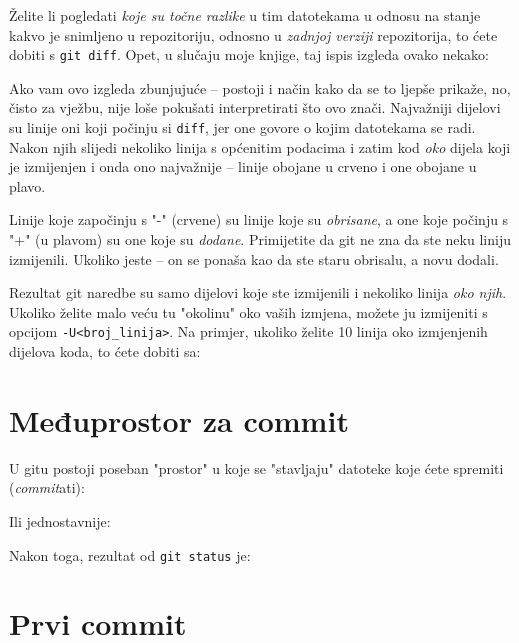 Želite li pogledati \emph{koje su točne razlike} u tim datotekama u odnosu na stanje kakvo je snimljeno u repozitoriju, odnosno u \emph{zadnjoj verziji} repozitorija, to ćete dobiti s \verb+git diff+. 
Opet, u slučaju moje knjige, taj ispis izgleda ovako nekako:



Ako vam ovo izgleda zbunjujuće -- postoji i način kako da se to ljepše prikaže, no, čisto za vježbu, nije loše pokušati interpretirati što ovo znači.
Najvažniji dijelovi su linije oni koji počinju si \verb+diff+, jer one govore o kojim datotekama se radi.
Nakon njih slijedi nekoliko linija s općenitim podacima i zatim kod \emph{oko} dijela koji je izmijenjen i onda ono najvažnije -- linije obojane u crveno i one obojane u plavo.

Linije koje započinju s "-" (crvene) su linije koje su \emph{obrisane}, a one koje počinju s "+" (u plavom) su one koje su \emph{dodane}. 
Primijetite da git ne zna da ste neku liniju izmijenili. 
Ukoliko jeste -- on se ponaša kao da ste staru obrisalu, a novu dodali.

Rezultat git naredbe su samo dijelovi koje ste izmijenili i nekoliko linija \emph{oko njih}.
Ukoliko želite malo veću tu "okolinu" oko vaših izmjena, možete ju izmijeniti s opcijom \verb+-U<broj_linija>+.
Na primjer, ukoliko želite 10 linija oko izmjenjenih dijelova koda, to ćete dobiti sa:


\section*{Međuprostor za commit}

U gitu postoji poseban "prostor" u koje se "stavljaju" datoteke koje ćete spremiti (\emph{commit}ati):



Ili jednostavnije:



Nakon toga, rezultat od \verb+git status+ je:



\section*{Prvi commit}

